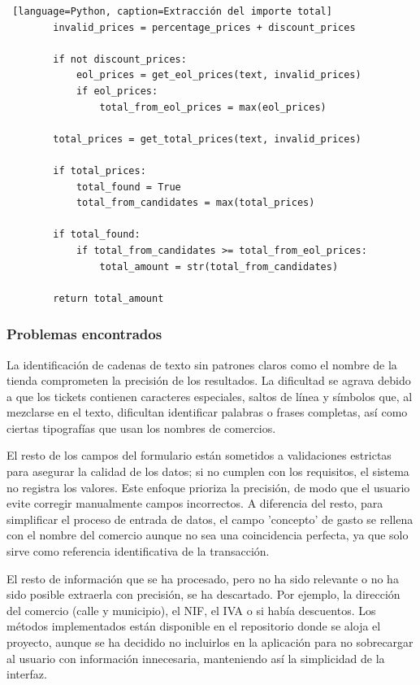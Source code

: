 \begin{itemize}
\begin{lstlisting} [language=Python, caption=Extracción del importe total]
        invalid_prices = percentage_prices + discount_prices

        if not discount_prices:
            eol_prices = get_eol_prices(text, invalid_prices)         
            if eol_prices:
                total_from_eol_prices = max(eol_prices)
        
        total_prices = get_total_prices(text, invalid_prices)

        if total_prices:
            total_found = True
            total_from_candidates = max(total_prices)      
        
        if total_found:
            if total_from_candidates >= total_from_eol_prices:
                total_amount = str(total_from_candidates)

        return total_amount
    \end{lstlisting}
\end{itemize}


\subsubsection{Problemas encontrados}
La identificación de cadenas de texto sin patrones claros como el nombre de la tienda comprometen la precisión de los resultados. La dificultad se agrava debido a que los tickets contienen caracteres especiales, saltos de línea y símbolos que, al mezclarse en el texto, dificultan identificar palabras o frases completas, así como ciertas tipografías que usan los nombres de comercios. 

El resto de los campos del formulario están sometidos a validaciones estrictas para asegurar la calidad de los datos; si no cumplen con los requisitos, el sistema no registra los valores. Este enfoque prioriza la precisión, de modo que el usuario evite corregir manualmente campos incorrectos. A diferencia del resto, para simplificar el proceso de entrada de datos, el campo 'concepto' de gasto se rellena con el nombre del comercio aunque no sea una coincidencia perfecta, ya que solo sirve como referencia identificativa de la transacción.

El resto de información que se ha procesado, pero no ha sido relevante o no ha sido posible extraerla con precisión, se ha descartado. Por ejemplo, la dirección del comercio (calle y municipio), el NIF, el IVA o si había descuentos. Los métodos implementados están disponible en el repositorio donde se aloja el proyecto, aunque se ha decidido no incluirlos en la aplicación para no sobrecargar al usuario con información innecesaria, manteniendo así la simplicidad de la interfaz.


